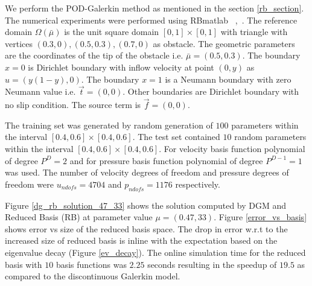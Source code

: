 \documentclass[graybox]{svmult}
\begin{document}
We perform the POD-Galerkin method as mentioned in the section \ref{rb_section}. The numerical experiments were performed using RBmatlab ~\cite{rbmatlab},~\cite{master_thesis}. The reference domain $\Omega({\bar{\mu}})$ is the unit square domain $[0,1] \times [0,1]$ with triangle with vertices $(0.3,0),(0.5,0.3),(0.7,0)$ as obstacle. The geometric parameters are the coordinates of the tip of the obstacle i.e. $\bar{\mu} = (0.5,0.3)$. The boundary ${x=0}$ is Dirichlet boundary with inflow velocity at point $(0,y)$ as $u = (y(1-y), 0)$. The boundary ${x = 1}$ is a Neumann boundary with zero Neumann value i.e. $\overrightarrow{t} = (0, 0)$. Other boundaries are Dirichlet boundary with no slip condition. The source term is $\overrightarrow{f} = (0,0)$.

The training set was generated by random generation of $100$ parameters within the interval $[0.4,0.6] \times [0.4,0.6]$. The test set contained $10$ random parameters within the interval $[0.4,0.6] \times [0.4,0.6]$. For velocity basis function polynomial of degree $P^D = 2$ and for pressure basis function polynomial of degree $P^{D-1} = 1$ was used. The number of velocity degrees of freedom and pressure degrees of freedom were $u_{ndofs} = 4704$ and $p_{ndofs} = 1176$ respectively.

Figure \ref{dg_rb_solution_47_33} shows the solution computed by DGM and Reduced Basis (RB) at parameter value $\mu = (0.47,33)$. Figure \ref{error_vs_basis} shows error vs size of the reduced basis space. The drop in error w.r.t to the increased size of reduced basis is inline with the expectation based on the eigenvalue decay (Figure \ref{ev_decay}). The online simulation time for the reduced basis with $10$ basis functions was $2.25$ seconds resulting in the speedup of $19.5$ as compared to the discontinuous Galerkin model.
\end{document}
